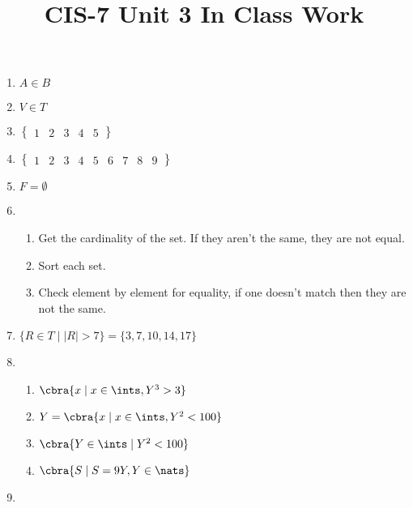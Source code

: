 \documentclass{article}
\title{CIS-7 Unit 3 In Class Work}
\begin{document}
\maketitle
\pagebreak

\begin{enumerate}
    \item $A\in B$
    \item $V\in T$
    \item $\begin{Bmatrix}
            1 & 2 & 3 & 4 & 5
    \end{Bmatrix}$
    \item $\begin{Bmatrix}
        1 & 2 & 3 & 4 & 5 & 6 & 7 & 8 & 9
    \end{Bmatrix}$
    \item $F = \emptyset $
    \item 
        \begin{enumerate}
            \item Get the cardinality of the set. If they aren't the same, they are not equal.
            \item Sort each set.
            \item Check element by element for equality, if one doesn't match then they are not the same.
        \end{enumerate}
        
    \item $
        \{R \in T \mid |R| > 7\} = \{3, 7, 10, 14, 17\}
    $

    \item 
        \begin{enumerate}
            \item $\cbra{x \mid x \in  \ints, Y^{3}>3}$
            \item $Y=\cbra{x \mid x \in \ints, Y^{2}<100}$ 
            \item $\cbra{Y \in \ints \mid Y^{2} < 100}$ 
            \item $\cbra{S \mid S = 9Y, Y \in \nats}$
        \end{enumerate}
        
    \item {}
\end{enumerate}
\end{document}
